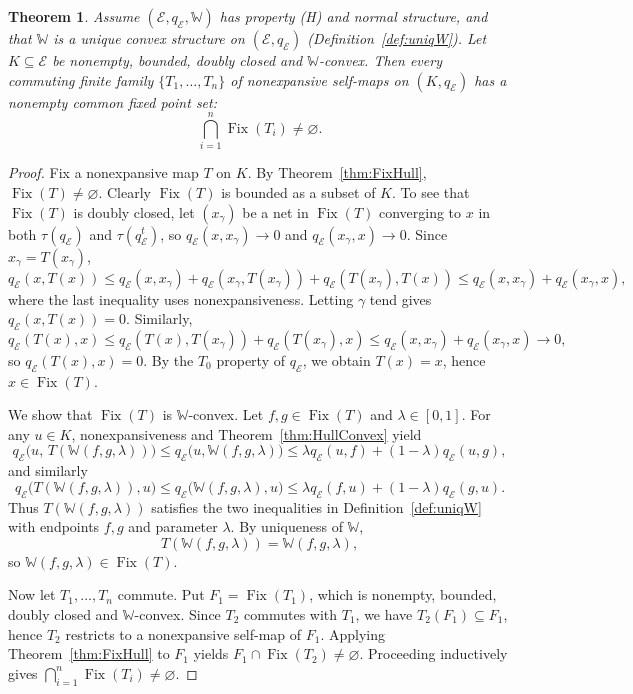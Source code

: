 \documentclass[preprint,12pt]{elsarticle}
\numberwithin{equation}{section}
\newtheorem{theorem}{Theorem}[section]
\newcommand{\E}{\mathcal{E}}
\newcommand{\Fix}{\operatorname{Fix}}
\begin{document}
\begin{theorem}\label{thm:CommonFix}
Assume $(\E,q_{\E},\mathbb{W})$ has property {\rm(H)} and normal structure, and that $\mathbb{W}$
is a unique convex structure on $(\E,q_{\E})$ (Definition~\ref{def:uniqW}).
Let $K\subseteq \E$ be nonempty, bounded, doubly closed and $\mathbb{W}$-convex.
Then every commuting finite family $\{T_1,\dots,T_n\}$ of nonexpansive self-maps on $(K,q_{\E})$
has a nonempty common fixed point set:
\[
\bigcap_{i=1}^{n}\Fix(T_i)\neq\varnothing.
\]
\end{theorem}

\begin{proof}
Fix a nonexpansive map $T$ on $K$. By Theorem~\ref{thm:FixHull}, $\Fix(T)\neq\varnothing$.
Clearly $\Fix(T)$ is bounded as a subset of $K$. To see that $\Fix(T)$ is doubly closed, let $(x_\gamma)$
be a net in $\Fix(T)$ converging to $x$ in both $\tau(q_{\E})$ and $\tau(q_{\E}^{t})$, so
$q_{\E}(x,x_\gamma)\to 0$ and $q_{\E}(x_\gamma,x)\to 0$. Since $x_\gamma=T(x_\gamma)$,
\[
q_{\E}(x,T(x))\le q_{\E}(x,x_\gamma)+q_{\E}(x_\gamma,T(x_\gamma))+q_{\E}(T(x_\gamma),T(x))
\le q_{\E}(x,x_\gamma)+q_{\E}(x_\gamma,x),
\]
where the last inequality uses nonexpansiveness. Letting $\gamma$ tend gives $q_{\E}(x,T(x))=0$.
Similarly,
\[
q_{\E}(T(x),x)\le q_{\E}(T(x),T(x_\gamma))+q_{\E}(T(x_\gamma),x)
\le q_{\E}(x,x_\gamma)+q_{\E}(x_\gamma,x)\to 0,
\]
so $q_{\E}(T(x),x)=0$. By the $T_{0}$ property of $q_{\E}$, we obtain $T(x)=x$, hence $x\in\Fix(T)$.

We show that $\Fix(T)$ is $\mathbb{W}$-convex. Let $f,g\in\Fix(T)$ and $\lambda\in[0,1]$.
For any $u\in K$, nonexpansiveness and Theorem~\ref{thm:HullConvex} yield
\[
q_{\E}\bigl(u,\,T(\mathbb{W}(f,g,\lambda))\bigr)
\le q_{\E}\bigl(u,\mathbb{W}(f,g,\lambda)\bigr)
\le \lambda q_{\E}(u,f)+(1-\lambda)q_{\E}(u,g),
\]
and similarly
\[
q_{\E}\bigl(T(\mathbb{W}(f,g,\lambda)),u\bigr)
\le q_{\E}\bigl(\mathbb{W}(f,g,\lambda),u\bigr)
\le \lambda q_{\E}(f,u)+(1-\lambda)q_{\E}(g,u).
\]
Thus $T(\mathbb{W}(f,g,\lambda))$ satisfies the two inequalities in Definition~\ref{def:uniqW} with endpoints
$f,g$ and parameter $\lambda$. By uniqueness of $\mathbb{W}$,
\[
T(\mathbb{W}(f,g,\lambda))=\mathbb{W}(f,g,\lambda),
\]
so $\mathbb{W}(f,g,\lambda)\in\Fix(T)$.

Now let $T_1,\dots,T_n$ commute. Put $F_1=\Fix(T_1)$, which is nonempty, bounded, doubly closed and
$\mathbb{W}$-convex. Since $T_2$ commutes with $T_1$, we have $T_2(F_1)\subseteq F_1$, hence $T_2$ restricts
to a nonexpansive self-map of $F_1$. Applying Theorem~\ref{thm:FixHull} to $F_1$ yields
$F_1\cap\Fix(T_2)\neq\varnothing$. Proceeding inductively gives $\bigcap_{i=1}^n \Fix(T_i)\neq\varnothing$.
\end{proof}
\end{document}
